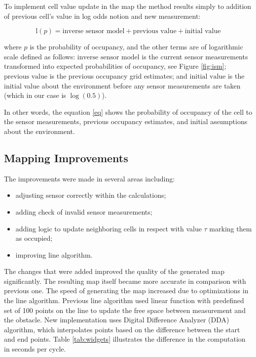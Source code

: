 \documentclass{article}
\begin{document}
To implement cell value update in the map \cite{taltech-bayes} \cite{test} the method results simply to addition of previous cell's value in log odds notion and new measurement:  

\begin{equation}
\label{eq}
\text{l}(p) = \text{inverse sensor model} + \text{previous value} + \text{initial value}
\end{equation}

where $p$ is the probability of occupancy, and the other terms are of logarithmic scale defined as follows: $\text{inverse sensor model}$ is the current sensor measurements transformed into expected probabilities of occupancy, see Figure \ref{fig:ism}; $\text{previous value}$ is the previous occupancy grid estimates; and $\text{initial value}$ is the initial value about the environment before any sensor measurements are taken (which in our case is $\log(0.5)$). \newline

In other words, the equation \ref{eq} shows the probability of occupancy of the cell to the sensor measurements, previous occupancy estimates, and initial assumptions about the environment.

\subsection{Mapping Improvements}

The improvements were made in several areas including:
\begin{itemize}
\item adjusting sensor correctly within the calculations;
\item adding check of invalid sensor measurements;
\item adding logic to update neighboring cells in respect with value $\tau$ marking them as occupied;
\item improving line algorithm.
\end{itemize}

The changes that were added improved the quality of the generated map significantly. The resulting map itself became more accurate in comparison with previous one. The speed of generating the map increased due to optimizations in the line algorithm. Previous line algorithm used linear function  with predefined set of 100 points on the line to update the free space between measurement and the obstacle. New implementation uses Digital Difference Analyzer (DDA) algorithm, which interpolates points based on the difference between the start and end points. Table \ref{tab:widgets} illustrates the difference in the computation in seconds per cycle. \newline
\end{document}
